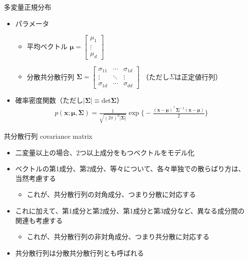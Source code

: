 \documentclass[aspectratio=169,unicode,dvipdfmx,14pt]{beamer}
\begin{document}
\begin{frame}{多変量正規分布}
\begin{itemize}
\item パラメータ
\begin{itemize}
\item 平均ベクトル
$\bm{\mu} = \begin{bmatrix} \mu_1 \\ \vdots \\ \mu_d \end{bmatrix}$
\item 分散共分散行列
$\bm{\Sigma} = \begin{bmatrix} \sigma_{11} & \cdots & \sigma_{1d} \\ 
\vdots & \ddots & \vdots \\
\sigma_{1d} & \cdots & \sigma_{dd} \end{bmatrix}$
（ただし$\Sigma$は正定値行列）
\end{itemize}
\item 確率密度関数（ただし$| \bm{\Sigma} | \equiv \mbox{det}\bm{\Sigma}$）
\begin{align}
p(\bm{x};\bm{\mu},\bm{\Sigma}) = \frac{1}{\sqrt{(2\pi)^d|\bm{\Sigma}|}}\exp\bigg\{ - \frac{(\bm{x} - \bm{\mu})^\intercal \bm{\Sigma}^{-1} (\bm{x} -\bm{\mu})}{2} \bigg\}
\end{align}
\end{itemize}
\end{frame}

\begin{frame}{共分散行列 covariance matrix}
\begin{itemize}
\item 二変量以上の場合、2つ以上成分をもつベクトルをモデル化
\item ベクトルの第1成分、第2成分、等々について、各々単独での散らばり方は、当然考慮する
\begin{itemize}
\item これが、共分散行列の対角成分、つまり分散に対応する
\end{itemize}
\item これに加えて、第1成分と第2成分、第1成分と第3成分など、異なる成分間の関連も考慮する
\begin{itemize}
\item これが、共分散行列の非対角成分、つまり共分散に対応する
\end{itemize}
\item 共分散行列は分散共分散行列とも呼ばれる
\end{itemize}
\end{frame}
\end{document}
